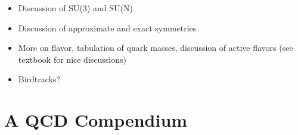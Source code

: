 \begin{subappendices}
\begin{itemize}
    \item
        Discussion of SU(3) and SU(N)

    \item
        Discussion of approximate and exact symmetries

    \item
        More on flavor, tabulation of quark masses, discussion of active flavors (see textbook for nice discussions)

    \item
        Birdtracks?
\end{itemize}

\fi



\section{A QCD Compendium}
\label{app:qcd-compendum}

\iffalse
In order to perform perturbative renormalization, let's first introduce the real-space action in terms of renormalized fields:
\begin{subequations}
\begin{align}
	\mathcal{L}
    &=
    -\frac{1}{4}
    Z_A^2
    F\indices{^a_{\mu\nu}} F\indices{^{a\,\mu\nu}}
    +
    \sum_\text{flavors}
        Z_q^2
        \,\,
        \bar{q}_j
        \le(
            i \slashed{D}\indices{^j_i}
            -
            m Z_m \delta\indices{^j_i}
        \ri)
        q^i
    \,,
\end{align}
\sam{expand out D slash, move definition to main text}

\begin{align}
    \le(D_\mu\ri)_{ij}
    =
    \delta\indices{^j_i} \partial_\mu
    +
    i g \le(T_F^a A\indices{^a_{\mu}}\ri)\indices{^j_i}
    \,.
\end{align}


i.e. with the bare fields and couplings given by
\begin{align}
    \sqrt{Z_q}\,q_i &= q_{(0)}
    \,,
    \qquad
    \sqrt{Z_A}\,A\indices{^a_\mu} = A\indices{^a_{\mu\,\,(0)}}
    \,,
    \qquad
    \\
    \frac{\mu^{\epsilon}\,Z_g}{\sqrt{Z_A} \, Z_q} \,\, g &
    = g_{(0)}
    \,,\qquad\quad
    \mu^{\sam{???}}
    Z_q^2 \, Z_m \, m = m_{(0)}
    \label{eq:bare_coupling}
    \,.
\end{align}
\end{subequations}
\fi


\end{subappendices}
